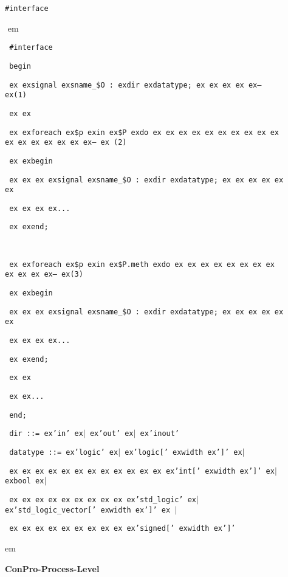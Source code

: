 \documentclass[a4paper,12pt,twoside,english]{article}
\def\s{\hskip 1.15 ex}
\begin{document}
\def\thesubsection{\tocXCVI}
\secII{\label{toclabelXCVI}\thesubsection}
\begin{description}
\item[] $ $\\
{\tt \#interface}

\item[]
\def\prefskipu{}\def\prefskipo{}\def\prefskipa{}\def\prefskipu{\hskip10pt}\def\prefskipo{\hskip10pt}\def\prefskipa{\hskip20pt}\def\content{
\vskip-5pt{\parindent0pt\parbox{\linewidth}{\tt\smallsize\hskip10pt \#interface}}
\vskip-5pt{\parindent0pt\parbox{\linewidth}{\tt\smallsize\hskip10pt begin}}
\vskip-5pt{\parindent0pt\parbox{\linewidth}{\tt\smallsize\hskip10pt \s \s signal\s sname\_\$O~:\s dir\s datatype;\s \s \s \s \s --\s (1)}}
\vskip-5pt{\parindent0pt\parbox{\linewidth}{\tt\smallsize\hskip10pt \s \s }}
\vskip-5pt{\parindent0pt\parbox{\linewidth}{\tt\smallsize\hskip10pt \s \s foreach\s \$p\s in\s \$P\s do\s \s \s \s \s \s \s \s \s \s \s \s \s \s \s \s \s --\s
(2)}}
\vskip-5pt{\parindent0pt\parbox{\linewidth}{\tt\smallsize\hskip10pt \s \s begin}}
\vskip-5pt{\parindent0pt\parbox{\linewidth}{\tt\smallsize\hskip10pt \s \s \s \s signal\s sname\_\$O~:\s dir\s datatype;\s \s \s \s \s \s }}
\vskip-5pt{\parindent0pt\parbox{\linewidth}{\tt\smallsize\hskip10pt \s \s \s \s ...}}
\vskip-5pt{\parindent0pt\parbox{\linewidth}{\tt\smallsize\hskip10pt \s \s end;}}
\vskip-5pt{\parindent0pt\parbox{\linewidth}{\tt\smallsize\hskip10pt }}
\vskip-5pt{\parindent0pt\parbox{\linewidth}{\tt\smallsize\hskip10pt \s \s foreach\s \$p\s in\s \$P.meth\s do\s \s \s \s \s \s \s \s \s \s \s \s --\s (3)}}
\vskip-5pt{\parindent0pt\parbox{\linewidth}{\tt\smallsize\hskip10pt \s \s begin}}
\vskip-5pt{\parindent0pt\parbox{\linewidth}{\tt\smallsize\hskip10pt \s \s \s \s signal\s sname\_\$O~:\s dir\s datatype;\s \s \s \s \s \s }}
\vskip-5pt{\parindent0pt\parbox{\linewidth}{\tt\smallsize\hskip10pt \s \s \s \s ...}}
\vskip-5pt{\parindent0pt\parbox{\linewidth}{\tt\smallsize\hskip10pt \s \s end;}}
\vskip-5pt{\parindent0pt\parbox{\linewidth}{\tt\smallsize\hskip10pt \s \s }}
\vskip-5pt{\parindent0pt\parbox{\linewidth}{\tt\smallsize\hskip10pt \s \s ...}}
\vskip-5pt{\parindent0pt\parbox{\linewidth}{\tt\smallsize\hskip10pt end;}}
\vskip-5pt{\parindent0pt\parbox{\linewidth}{\tt\smallsize\hskip10pt dir~::=\s 'in'\s $|$\s 'out'\s $|$\s 'inout'}}
\vskip-5pt{\parindent0pt\parbox{\linewidth}{\tt\smallsize\hskip10pt datatype~::=\s 'logic'\s $|$\s 'logic{[}'\s width\s '{]}'\s $|$}}
\vskip-5pt{\parindent0pt\parbox{\linewidth}{\tt\smallsize\hskip10pt \s \s \s \s \s \s \s \s \s \s \s \s \s 'int{[}'\s width\s '{]}'\s $|$\s bool\s $|$}}
\vskip-5pt{\parindent0pt\parbox{\linewidth}{\tt\smallsize\hskip10pt \s \s \s \s \s \s \s \s \s \s 'std\_logic'\s $|$\s 'std\_logic\_vector{[}'\s width\s '{]}'\s
$|$}}
\vskip-5pt{\parindent0pt\parbox{\linewidth}{\tt\smallsize\hskip10pt \s \s \s \s \s \s \s \s \s \s 'signed{[}'\s width\s '{]}'}}
}
$ $
 em
\content
{} em
\item[] $ $\\
{\bfseries ConPro-Process-Level}


\end{description}
\end{document}
